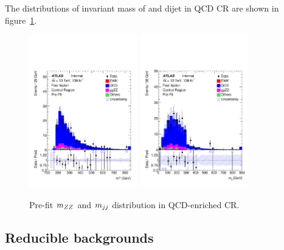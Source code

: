 The distributions of invariant mass of \llll and dijet in QCD CR are shown in figure~\ref{fig:qcdcr_prefit}.
\begin{figure}[!htb]
  \centering
  \includegraphics[width=0.42\textwidth]{figures/VBSZZ/QCDCR/MZZ_4l_QCD_CR.pdf}
  \includegraphics[width=0.42\textwidth]{figures/VBSZZ/QCDCR/MJJ_4l_QCD_CR_fullSyst.pdf}
  \caption{Pre-fit $m_{ZZ}$ and $m_{jj}$ distribution in QCD-enriched CR.}
  \label{fig:qcdcr_prefit}
\end{figure}

\subsection{Reducible backgrounds}

